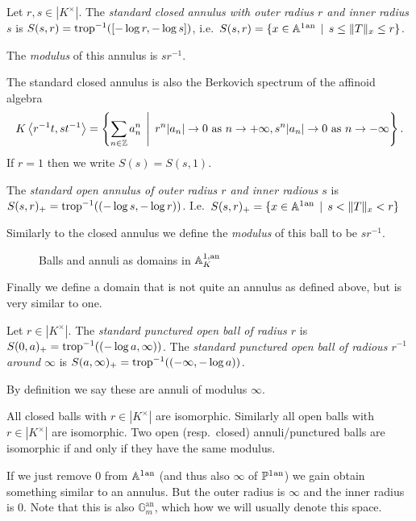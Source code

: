 \begin{definition}
	Let $r, s \in |K^{\times }|$. 
	The \emph{standard closed annulus with outer radius  $r$ and inner radius  $s$}  is $S(s, r) = \operatorname{trop}^{-1}([-\log r, -\log s])$, i.e.\ $S(s, r) = \{x \in \aff^{1}\an \st s \le \|T\|_x \le r\} $.

	The \emph{modulus} of this annulus is $s r^{-1}$. 
\end{definition}
The standard closed annulus is also the Berkovich spectrum of the affinoid algebra \[
	K\left<r^{-1}t, st^{-1} \right> = \left\{\sum_{n \in \Z}^{} a_n ^{n} \st r^{n}|a_n| \to 0 \text{ as } n \to +\infty, s^n |a_n| \to 0 \text{ as } n \to - \infty\right\} 
.\] 
If $r = 1$ then we write $S(s) = S(s,1)$. 
\begin{definition}
	The \emph{standard open annulus of outer radius $r$ and inner radious $s$} is $S(s,r)_+ = \operatorname{trop}^{-1}((-\log s, -\log r))$. 
	I.e.\ $S(s,r)_+ = \{x \in \aff^{1}\an \st s < \|T\|_x < r\} $

	Similarly to the closed annulus we define the \emph{modulus} of this ball to be $s r^{-1}$. 
\end{definition}

\begin{figure}[ht]
    \centering
    \caption{Balls and annuli as domains in $\mathbb{A}^{1, \text{an}}_K$}
    \label{fig:affine-line-ball-annuli}
\end{figure}

Finally we define a domain that is not quite an annulus as defined above, but is very similar to one. 
\begin{definition}
	Let $r \in |K^{\times }|$. The \emph{standard punctured open ball of radius $r$ } is $S(0, a)_+ = \operatorname{trop}^{-1}((-\log a, \infty))$. 
	The \emph{standard punctured open ball of radious $r^{-1}$ around $\infty$} is $S(a, \infty)_+ = \operatorname{trop}^{-1}((-\infty, -\log a))$. 

	By definition we say these are annuli of modulus $\infty$. 
\end{definition}

All closed balls with $r \in |K^{\times }|$ are isomorphic. Similarly all open balls with $r \in |K^{\times }|$ are isomorphic. 
Two open (resp.\ closed) annuli/punctured balls are isomorphic if and only if they have the same modulus. 

\begin{remark}
	If we just remove $0$ from $\mathbb{A}^{1}{}^{\text{an}}$ (and thus also $\infty$ of $\mathbb{P}^{1}{}^{\text{an}}$) we gain obtain something similar to an annulus. But the outer radius is $\infty$ and the inner radius is $0$. 
	Note that this is also $\mathbb G^{\mathrm{an}}_m$, which how we will usually denote this space. 
\end{remark}


